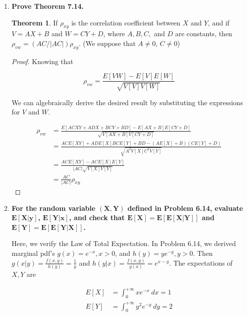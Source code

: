 \documentclass[10pt, oneside]{article}   	%
\theoremstyle{definition}
\newtheorem*{thm*}{Theorem}
\begin{document}
\begin{enumerate}[label=7.\arabic*]
\item  \begin{tcolorbox}[
  colback=Cerulean!5!white,
  colframe=Cerulean!75!black]
  \textbf{Prove Theorem 7.14.}
  \end{tcolorbox}
  
  \begin{thm*}
  If $\rho_{xy}$ is the correlation coefficient between $X$ and $Y$, and if $V = AX + B$ and $W = CY + D$, where $A, B, C,$ and $D$ are constants, then $\rho_{vw} = (AC / |AC|) \rho_{xy}$. (We suppose that $A \neq 0$, $C \neq 0$)
  \end{thm*}
  
  \begin{proof}
  Knowing that 
  
  \[ \rho_{vw} = \frac{E[VW] - E[V] E[W]}{\sqrt{V[V] V[W]}} \]
  
  We can algebraically derive the desired result by substituting the expressions for $V$ and $W$.
  
  \begin{align*}
  \rho_{vw} &= \frac{E[ACXY + ADX + BCY + BD] - E[AX + B] E[CY + D]}{\sqrt{V[AX+B] V[CY + D]}} \\
  &= \frac{ACE[XY] + ADE[X] BCE[Y] + BD - (AE[X] + B)(CE[Y] + D)}{\sqrt{A^2 V[X] C^2 V[Y]}} \\
  &= \frac{ACE[XY] - ACE[X] E[Y]}{|AC| \sqrt{V[X] V[Y]}} \\
  &= \boxed{\frac{AC}{|AC|} \rho_{xy}}
  \end{align*}
  \end{proof}
  
\item  \begin{tcolorbox}[
  colback=Cerulean!5!white,
  colframe=Cerulean!75!black]
  \textbf{For the random variable $\bm{(X,Y)}$ defined in Problem 6.14, evaluate $\bm{E[X | y]}$, $\bm{E[Y | x]}$, and check that $\bm{E[X] = E[E[X | Y]]}$ and $\bm{E[Y] = E[E[Y | X]]}$.}
  \end{tcolorbox}
  
  Here, we verify the Law of Total Expectation. In Problem 6.14, we derived marginal pdf's $g(x) = e^{-x}, x > 0$, and $h(y) = ye^{-y}, y > 0$. Then $g(x | y) = \frac{f(x,y)}{h(y)} = \frac{1}{y}$ and $h(y | x) = \frac{f(x,y)}{g(x)} = e^{x-y}$. The expectations of $X, Y$ are 
  
  \begin{align*}
  E[X] &= \int^{+\infty}_0 x e^{-x} \ dx = \boxed{1} \\
  E[Y] &= \int^{+\infty}_0 y^2 e^{-y} \ dy = \boxed{2}
  \end{align*}
  

\end{enumerate}
\end{document}
